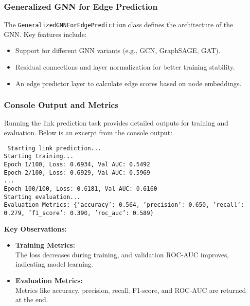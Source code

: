 {	\subsubsection{Generalized GNN for Edge Prediction}
	The \texttt{GeneralizedGNNForEdgePrediction} class defines the architecture of the GNN. Key features include:
	\begin{itemize}
		\item Support for different GNN variants (e.g., GCN, GraphSAGE, GAT).
		\item Residual connections and layer normalization for better training stability.
		\item An edge predictor layer to calculate edge scores based on node embeddings.
	\end{itemize}
	
	\subsubsection{Console Output and Metrics}
	Running the link prediction task provides detailed outputs for training and evaluation. Below is an excerpt from the console output:
	
	\begin{tcolorbox}[colback=gray!10, colframe=gray!50, sharp corners, boxrule=0.5mm]
		\texttt{
			Starting link prediction...\\
			Starting training...\\
			Epoch 1/100, Loss: 0.6934, Val AUC: 0.5492\\
			Epoch 2/100, Loss: 0.6929, Val AUC: 0.5969\\
			...\\
			Epoch 100/100, Loss: 0.6181, Val AUC: 0.6160\\
			Starting evaluation...\\
			Evaluation Metrics: \{'accuracy': 0.564, 'precision': 0.650, 'recall': 0.279, 'f1\_score': 0.390, 'roc\_auc': 0.589\}
		}
	\end{tcolorbox}
	
	\textbf{Key Observations:}
	\begin{itemize}
		\item \textbf{Training Metrics:} \\
		The loss decreases during training, and validation ROC-AUC improves, indicating model learning.
		\item \textbf{Evaluation Metrics:} \\
		Metrics like accuracy, precision, recall, F1-score, and ROC-AUC are returned at the end.
	\end{itemize}}

